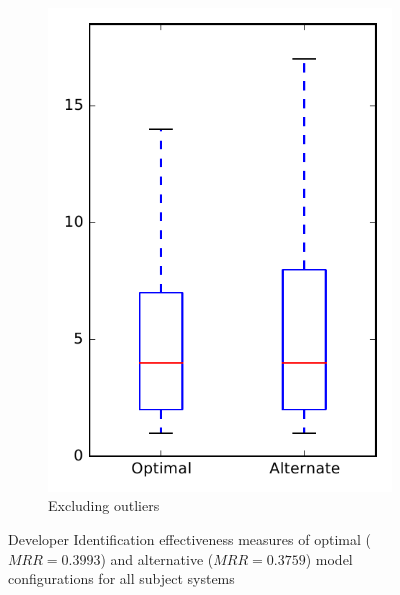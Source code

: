 \begin{figure}
\begin{subfigure}{.4\textwidth}
        \includegraphics[height=0.4\textheight]{figures/combo/dit_rq1_all_no_outlier}
        \caption{Excluding outliers}\label{fig:combo:dit:rq1:all_no_outlier}
    \end{subfigure}
\caption{Developer Identification effectiveness measures of optimal ($MRR=0.3993$) and alternative ($MRR=0.3759$) model configurations for all subject systems}
\label{fig:combo:dit:rq1:all}
\end{figure}
